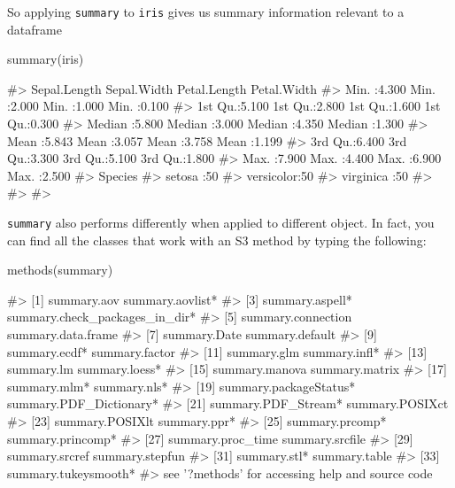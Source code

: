 So applying \texttt{summary} to \texttt{iris} gives us summary
information relevant to a dataframe

\begin{Schunk}
\begin{Sinput}
summary(iris)
\end{Sinput}
\begin{Soutput}
#>   Sepal.Length    Sepal.Width     Petal.Length    Petal.Width   
#>  Min.   :4.300   Min.   :2.000   Min.   :1.000   Min.   :0.100  
#>  1st Qu.:5.100   1st Qu.:2.800   1st Qu.:1.600   1st Qu.:0.300  
#>  Median :5.800   Median :3.000   Median :4.350   Median :1.300  
#>  Mean   :5.843   Mean   :3.057   Mean   :3.758   Mean   :1.199  
#>  3rd Qu.:6.400   3rd Qu.:3.300   3rd Qu.:5.100   3rd Qu.:1.800  
#>  Max.   :7.900   Max.   :4.400   Max.   :6.900   Max.   :2.500  
#>        Species  
#>  setosa    :50  
#>  versicolor:50  
#>  virginica :50  
#>                 
#>                 
#> 
\end{Soutput}
\end{Schunk}

\texttt{summary} also performs differently when applied to different
object. In fact, you can find all the classes that work with an S3
method by typing the following:

\begin{Schunk}
\begin{Sinput}
methods(summary)
\end{Sinput}
\begin{Soutput}
#>  [1] summary.aov                    summary.aovlist*              
#>  [3] summary.aspell*                summary.check_packages_in_dir*
#>  [5] summary.connection             summary.data.frame            
#>  [7] summary.Date                   summary.default               
#>  [9] summary.ecdf*                  summary.factor                
#> [11] summary.glm                    summary.infl*                 
#> [13] summary.lm                     summary.loess*                
#> [15] summary.manova                 summary.matrix                
#> [17] summary.mlm*                   summary.nls*                  
#> [19] summary.packageStatus*         summary.PDF_Dictionary*       
#> [21] summary.PDF_Stream*            summary.POSIXct               
#> [23] summary.POSIXlt                summary.ppr*                  
#> [25] summary.prcomp*                summary.princomp*             
#> [27] summary.proc_time              summary.srcfile               
#> [29] summary.srcref                 summary.stepfun               
#> [31] summary.stl*                   summary.table                 
#> [33] summary.tukeysmooth*          
#> see '?methods' for accessing help and source code
\end{Soutput}
\end{Schunk}

